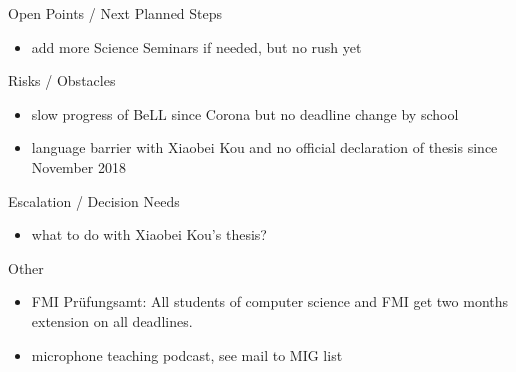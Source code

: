 \documentclass[]{kiesgrube}
\begin{document}
\begin{poster}
\begin{posterbox}[name=open,column=1,below=description]{Open Points / Next Planned Steps}
\begin{itemize}
\item add more Science Seminars if needed, but no rush yet
\end{itemize}
\end{posterbox}
\begin{posterbox}[name=risks,column=1,below=open]{Risks / Obstacles}
\begin{itemize}
\item slow progress of BeLL since Corona but no deadline change by school
\item language barrier with Xiaobei Kou and no official declaration of thesis since November 2018
\end{itemize}
\end{posterbox}
\begin{posterbox}[name=escalation,column=1,below=risks]{Escalation / Decision Needs}
\begin{itemize}
\item what to do with Xiaobei Kou's thesis?
\end{itemize}
\end{posterbox}
\begin{posterbox}[name=other,column=1,below=escalation]{Other}
\begin{itemize}
\item FMI Prüfungsamt: All students of computer science and FMI get two months extension on all deadlines.
\item microphone teaching podcast, see mail to MIG list
\end{itemize}
\end{posterbox}
\end{poster}
\end{document}
